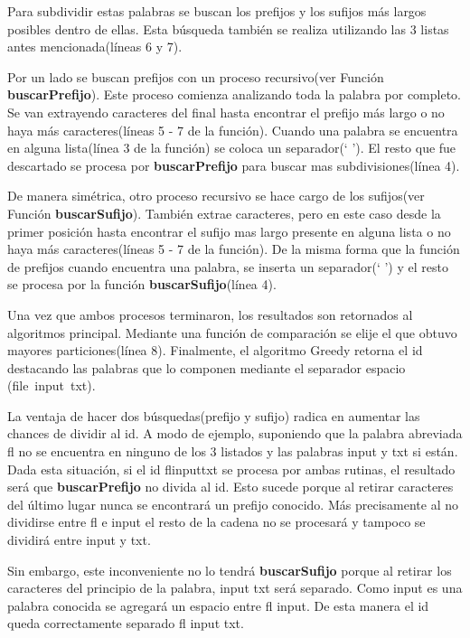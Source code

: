 \documentclass[a4paper,12pt]{report}
\begin{document}
Para subdividir estas palabras se buscan los prefijos y los sufijos más largos posibles dentro de ellas. Esta búsqueda también se realiza utilizando las 3 listas antes mencionada(líneas 6 y 7).

Por un lado se buscan prefijos con un proceso recursivo(ver Función \mbox{\textbf{buscarPrefijo}}). Este proceso comienza analizando toda la palabra por completo. Se van extrayendo caracteres del final hasta encontrar el prefijo más largo o no haya más caracteres(líneas 5 - 7 de la función). %
Cuando una palabra se encuentra en alguna lista(línea 3 de la función) se coloca un separador(` '). El resto que fue descartado se procesa por \textbf{buscarPrefijo} para buscar mas subdivisiones(línea 4).

De manera simétrica, otro proceso recursivo se hace cargo de los sufijos(ver Función \textbf{buscarSufijo}). También extrae caracteres, pero en este caso desde la primer posición hasta encontrar el sufijo mas largo presente en alguna lista o no haya más caracteres(líneas 5 - 7 de la función). %
De la misma forma que la función de prefijos cuando encuentra una palabra, se inserta un separador(` ') y el resto se procesa por la función \textbf{buscarSufijo}(línea 4).

Una vez que ambos procesos terminaron, los resultados son retornados al algoritmos principal. Mediante una función de comparación se elije el que obtuvo mayores particiones(línea 8). Finalmente, el algoritmo Greedy retorna el id destacando las palabras que lo componen mediante el separador espacio \mbox{(\textsf{file input txt})}.

La ventaja de hacer dos búsquedas(prefijo y sufijo) radica en aumentar las chances de dividir al id. A modo de ejemplo, suponiendo que la palabra abreviada \textsf{fl}
no se encuentra en ninguno de los 3 listados y las palabras \textsf{input} y \textsf{txt} si están. Dada esta situación, si el id \textsf{flinputtxt} se procesa por ambas rutinas, el resultado será que \textbf{buscarPrefijo} no divida al id. Esto sucede porque al retirar caracteres del último lugar nunca se encontrará un prefijo conocido. Más precisamente al no dividirse entre \textsf{fl} e \textsf{input} el resto de la cadena no se procesará y tampoco se dividirá entre \textsf{input} y \textsf{txt}. 

Sin embargo, este inconveniente no lo tendrá \textbf{buscarSufijo} porque al retirar los caracteres del principio de la palabra, \textsf{input txt} será separado. Como \textsf{input} es una palabra conocida se agregará un espacio entre \textsf{fl input}. De esta manera el id queda correctamente separado \textsf{fl input txt}.\\
\end{document}
